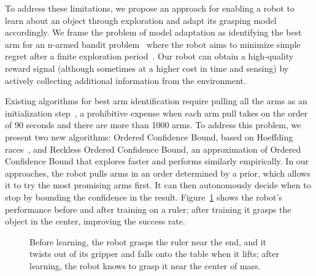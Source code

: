 \documentclass{article}
\newcommand{\algorithmCTxt}{Ordered Confidence Bound\xspace}
\newcommand{\algorithmDTxt}{Reckless Ordered Confidence Bound\xspace}
\begin{document}
To address these limitations, we propose an approach for enabling a
robot to learn about an object through exploration and adapt its
grasping model accordingly.  We frame the problem of model adaptation
as identifying the best arm for an n-armed bandit
problem~\citep{thompson33} where the robot aims to minimize simple
regret after a finite exploration period~\citep{bubeck09}.  Our robot
can obtain a high-quality reward signal (although sometimes at a
higher cost in time and sensing) by actively collecting additional
information from the environment.  

Existing algorithms for best arm identification require pulling all
the arms as an initialization step~\citep{mannor04, audibert10,
  chen14}, a prohibitive expense when each arm pull takes on the order
of 90 seconds and there are more than 1000 arms.  To address this
problem, we present two new algorithms: \algorithmCTxt, based on
Hoeffding races~\citep{maron93}, and \algorithmDTxt, an approximation
of \algorithmCTxt that explores faster and performs similarly
empirically. In our approaches, the robot pulls arms in an order
determined by a prior, which allows it to try the most promising arms
first. It can then autonomously decide when to stop by bounding the
confidence in the result.  Figure~\ref{fig:ruler} shows the robot's
performance before and after training on a ruler; after training it
grasps the object in the center, improving the success rate.
\begin{figure}
%
\caption{Before learning, the robot grasps the ruler near the end, and it twists out of its gripper and falls onto the table when it lifts; after learning, the robot knows to grasp it near the center of mass.\label{fig:ruler}}
\end{figure}
\end{document}

